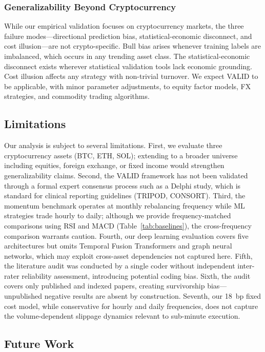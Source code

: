 \documentclass[preprint,12pt,authoryear]{elsarticle}
\begin{document}
\subsubsection{Generalizability Beyond Cryptocurrency}
While our empirical validation focuses on cryptocurrency markets, the three failure modes---directional prediction bias, statistical-economic disconnect, and cost illusion---are not crypto-specific. Bull bias arises whenever training labels are imbalanced, which occurs in any trending asset class. The statistical-economic disconnect exists wherever statistical validation tools lack economic grounding. Cost illusion affects any strategy with non-trivial turnover. We expect VALID to be applicable, with minor parameter adjustments, to equity factor models, FX strategies, and commodity trading algorithms.

\subsection{Limitations}

Our analysis is subject to several limitations. First, we evaluate three cryptocurrency assets (BTC, ETH, SOL); extending to a broader universe including equities, foreign exchange, or fixed income would strengthen generalizability claims. Second, the VALID framework has not been validated through a formal expert consensus process such as a Delphi study, which is standard for clinical reporting guidelines (TRIPOD, CONSORT). Third, the momentum benchmark operates at monthly rebalancing frequency while ML strategies trade hourly to daily; although we provide frequency-matched comparisons using RSI and MACD (Table~\ref{tab:baselines}), the cross-frequency comparison warrants caution. Fourth, our deep learning evaluation covers five architectures but omits Temporal Fusion Transformers \citep{lim2021temporal} and graph neural networks, which may exploit cross-asset dependencies not captured here. Fifth, the literature audit was conducted by a single coder without independent inter-rater reliability assessment, introducing potential coding bias. Sixth, the audit covers only published and indexed papers, creating survivorship bias---unpublished negative results are absent by construction. Seventh, our 18~bp fixed cost model, while conservative for hourly and daily frequencies, does not capture the volume-dependent slippage dynamics relevant to sub-minute execution.

\subsection{Future Work}
\end{document}
